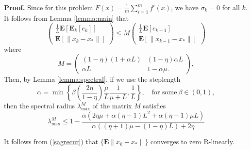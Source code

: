 \documentclass[11pt]{article}
\newcommand{\E}{\mathbf{E}}
\begin{document}
\noindent 
\textbf{Proof.}  Since for this problem $F(x) =  \frac{1}{m} \sum_{i =1}^m f^i(x) $, we have $\sigma_k=0$ for all $k$.
It follows from Lemma \ref{lemma:main} that 
\begin{equation}\label{sagrecur}
 \begin{pmatrix} \frac{1}{L}\E[\E_k[e_k]]\\ \E[\|x_k-x_\ast \|]  \end{pmatrix} 
\leq M
 \begin{pmatrix} \frac{1}{L}\E[e_{k-1}] \\ \E[\| x_{k-1}-x_\ast \|]  \end{pmatrix} 
\end{equation}
where
\begin{equation}\label{M2}
 M = \begin{pmatrix} (1-\eta)(1+\alpha  L)  &   (1-\eta)\alpha L \\  
                   \alpha L  & 1-\alpha \mu  .
                    \end{pmatrix},                   
\end{equation}
Then, by Lemma \ref{lemma:spectral}, if we use the  steplength
 \begin{equation}\label{alphasag}
 \alpha = \min\left\lbrace\beta\left(\frac{2 \eta}{1-\eta} \right)\frac{\mu}{L}\frac{1}{\mu+L},\frac{1}{L}\right\rbrace, \quad \mbox{for some} \ \beta  \in(0,1),
 \end{equation} 
then the spectral radius $\lambda^M_{\max}$ of the matrix $M$  satisfies
     \begin{equation}\label{sagspec}
  \lambda^M_{\max} \leq 1-\frac{\alpha  \left(2 \eta  \mu +\alpha  (\eta -1) L^2+\alpha  (\eta -1) \mu  L\right)}{\alpha  ((\eta +1) \mu -  (1-\eta ) L)+2 \eta }
   \end{equation}
	
  It follows from (\ref{sagrecur}) that $\{\E\|x_k-x_\ast\|\}$  converges to zero R-linearly.
  
\end{document}
